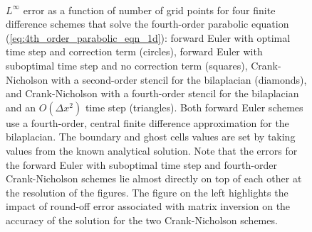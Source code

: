 \documentclass[fleqn,12pt,twoside]{article}
\def\dx{\Delta x}
\begin{document}
\begin{figure}[tb]
\begin{center}
\ \ 
\caption{$L^\infty$ error as a function of number of grid points for four
finite difference schemes that solve the fourth-order parabolic equation
(\ref{eq:4th_order_parabolic_eqn_1d}):
forward Euler with optimal time step and correction term (circles),
forward Euler with suboptimal time step and no correction term (squares),
Crank-Nicholson with a second-order stencil for the bilaplacian (diamonds), 
and Crank-Nicholson with a fourth-order stencil for the bilaplacian and
an $O(\dx^2)$ time step (triangles).
Both forward Euler schemes use a fourth-order, central finite difference 
approximation for the bilaplacian.  The boundary and ghost cells values
are set by taking values from the known analytical solution.
Note that the errors for the forward Euler with suboptimal time step and 
fourth-order Crank-Nicholson schemes lie almost directly on top of each 
other at the resolution of the figures.  
The figure on the left highlights the impact of round-off error associated 
with matrix inversion on the accuracy of the solution for the two 
Crank-Nicholson schemes.
}
\label{fig:4th_order_parabolic_eqn_1d_error}
\end{center}
\end{figure}
\end{document}
